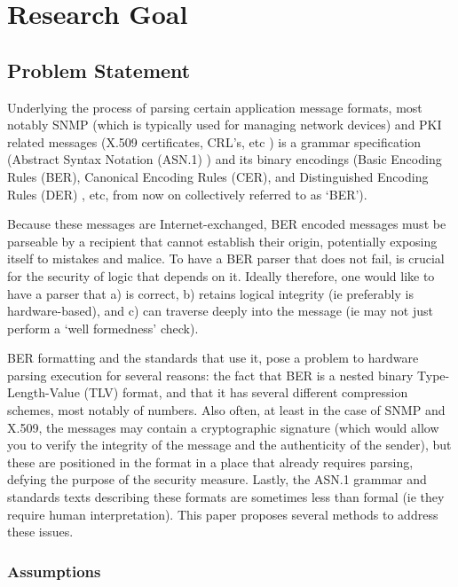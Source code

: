 \section{Research Goal}

\subsection{Problem Statement}

Underlying the process of parsing certain application message formats,
most notably SNMP \cite{bib:snmp}
(which is typically used for managing network devices) and PKI 
related messages (X.509 certificates, CRL’s, etc \cite{bib:x509})
is a grammar 
specification (Abstract Syntax Notation (ASN.1) \cite{bib:asn1})
and its binary 
encodings (Basic Encoding Rules (BER), Canonical Encoding Rules (CER), and 
Distinguished Encoding Rules (DER) \cite{bib:ber},
etc, from now on collectively 
referred to as ‘BER’).

Because these messages are Internet-exchanged, BER encoded messages must 
be parseable by a recipient that cannot establish their origin, 
potentially exposing itself to mistakes and malice. To have a BER parser 
that does not fail, is crucial for the security of logic that depends on 
it. Ideally therefore, one would like to have a parser that a) is correct, 
b) retains logical integrity (ie preferably is hardware-based), and c) can 
traverse deeply into the message (ie may not just perform a ‘well 
formedness’ check).

BER formatting and the standards that use it, pose a problem to hardware 
parsing execution for several reasons: the fact that BER is a nested 
binary Type-Length-Value (TLV) format, and that it has several different 
compression schemes, most notably of numbers. Also often, at least in the 
case of SNMP and X.509, the messages may contain a cryptographic signature 
(which would allow you to verify the integrity of the message and the 
authenticity of the sender), but these are positioned in the format in a 
place that already requires parsing, defying the purpose of the security 
measure. Lastly, the ASN.1 grammar and standards texts describing these 
formats are sometimes less than formal (ie they require human 
interpretation). This paper proposes several methods to address these 
issues.

\subsubsection{Assumptions}


